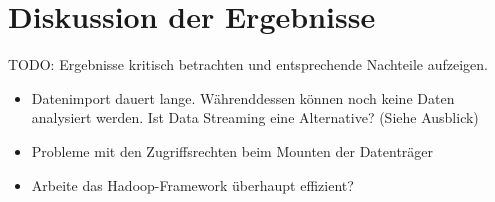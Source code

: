 \chapter{Diskussion der Ergebnisse}
\label{ch:result_discussion}

TODO: Ergebnisse kritisch betrachten und entsprechende Nachteile aufzeigen.
\begin{itemize}
\item Datenimport dauert lange. Währenddessen können noch keine Daten analysiert werden. Ist Data Streaming eine Alternative? (Siehe Ausblick)
\item Probleme mit den Zugriffsrechten beim Mounten der Datenträger
\item Arbeite das Hadoop-Framework überhaupt effizient?
\end{itemize}